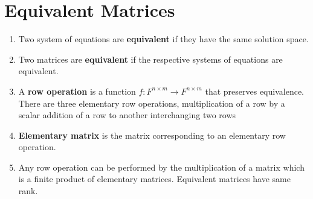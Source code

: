\section{Equivalent Matrices}
\begin{enumerate}
	\item Two system of equations are \textbf{equivalent} if they have the same solution space.
	\item Two matrices are \textbf{equivalent} if the respective systems of equations are equivalent.
	\item A \textbf{row operation} is a function $f : F^{n \times m} \to F^{n \times m}$ that preserves equivalence.
	There are three elementary row operations,
		\subitem multiplication of a row by a scalar
		\subitem addition of a row to another
		\subitem interchanging two rows
	\item \textbf{Elementary matrix} is the matrix corresponding to an elementary row operation.
	\item Any row operation can be performed by the multiplication of a matrix which is a finite product of elementary matrices.
		\subitem Equivalent matrices have same rank.
\end{enumerate}

